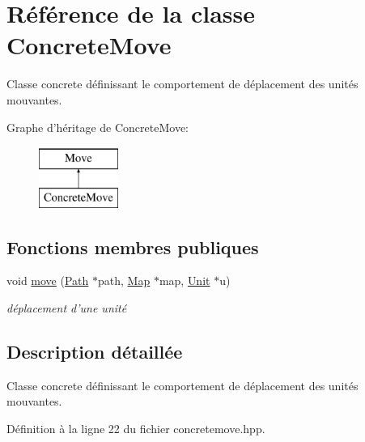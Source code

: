 \hypertarget{classConcreteMove}{\section{Référence de la classe Concrete\+Move}
\label{classConcreteMove}
}


Classe concrete définissant le comportement de déplacement des unités mouvantes.  


Graphe d'héritage de Concrete\+Move\+:\begin{figure}[H]
\begin{center}
\leavevmode
\includegraphics[height=2.000000cm]{classConcreteMove}
\end{center}
\end{figure}
\subsection*{Fonctions membres publiques}
\begin{DoxyCompactItemize}
\item 
void \hyperlink{classConcreteMove_adbbcf93faa6dad1660a922618b905ff1}{move} (\hyperlink{classPath}{Path} $\ast$path, \hyperlink{classMap}{Map} $\ast$map, \hyperlink{classUnit}{Unit} $\ast$u)
\begin{DoxyCompactList}\small\item\em déplacement d'une unité \end{DoxyCompactList}\end{DoxyCompactItemize}


\subsection{Description détaillée}
Classe concrete définissant le comportement de déplacement des unités mouvantes. 

Définition à la ligne 22 du fichier concretemove.\+hpp.



